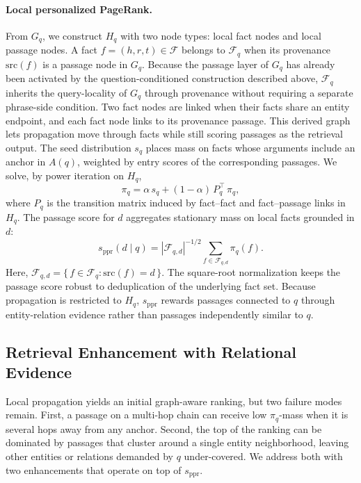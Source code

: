 \paragraph{Local personalized PageRank.}
From $G_q$, we construct $H_q$ with two node types: local fact nodes and
local passage nodes. A fact $f=(h,r,t) \in \mathcal{F}$ belongs to
$\mathcal{F}_q$ when its provenance $\mathrm{src}(f)$ is a passage node
in $G_q$. Because the passage layer of $G_q$ has already been activated
by the question-conditioned construction described above,
$\mathcal{F}_q$ inherits the query-locality of $G_q$ through provenance
without requiring a separate phrase-side condition. Two fact nodes are
linked when their facts share an entity endpoint, and each fact node
links to its provenance passage. This derived graph lets propagation
move through facts while still scoring passages as the retrieval output.
The seed distribution $s_q$ places mass on facts whose arguments include
an anchor in $A(q)$, weighted by entry scores of the corresponding
passages. We solve, by power iteration on $H_q$,
\begin{equation}
\label{eq:local-ppr}
\pi_q = \alpha\, s_q + (1-\alpha)\, P_q^{\!\top}\, \pi_q,
\end{equation}
where $P_q$ is the transition matrix induced by fact--fact and
fact--passage links in $H_q$. The passage score for $d$ aggregates
stationary mass on local facts grounded in $d$:
\begin{equation}
\label{eq:passage-score}
s_{\mathrm{ppr}}(d \mid q)
=
|\mathcal{F}_{q,d}|^{-1/2}
\sum_{f \in \mathcal{F}_{q,d}} \pi_q(f).
\end{equation}
Here,
$\mathcal{F}_{q,d}=\{\,f\in\mathcal{F}_q:\mathrm{src}(f)=d\,\}$.
The square-root normalization keeps the passage score robust to
deduplication of the underlying fact set. Because propagation is
restricted to $H_q$, $s_{\mathrm{ppr}}$ rewards passages connected to
$q$ through entity-relation evidence rather than passages independently
similar to $q$.

\subsection{Retrieval Enhancement with Relational Evidence}
\label{sec:method:enhancement}

Local propagation yields an initial graph-aware ranking, but two failure
modes remain. First, a passage on a multi-hop chain can receive low
$\pi_q$-mass when it is several hops away from any anchor. Second, the
top of the ranking can be dominated by passages that cluster around a
single entity neighborhood, leaving other entities or relations demanded
by $q$ under-covered. We address both with two enhancements that operate
on top of $s_{\mathrm{ppr}}$.


